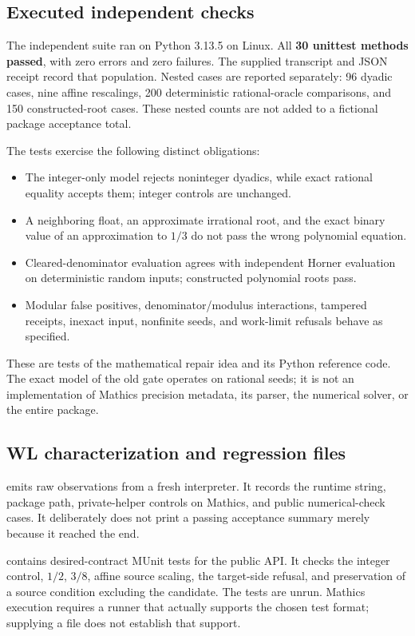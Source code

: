 \documentclass[11pt,letterpaper]{article}
\newcommand{\code}[1]{\texttt{\detokenize{#1}}}
\begin{document}
\subsection{Executed independent checks}

The independent suite ran on Python 3.13.5 on Linux. All \textbf{30 unittest methods passed}, with zero errors and zero failures. The supplied transcript and JSON receipt record that population. Nested cases are reported separately: 96 dyadic cases, nine affine rescalings, 200 deterministic rational-oracle comparisons, and 150 constructed-root cases. These nested counts are not added to a fictional package acceptance total.

The tests exercise the following distinct obligations:
\begin{itemize}
\item The integer-only model rejects noninteger dyadics, while exact rational equality accepts them; integer controls are unchanged.
\item A neighboring float, an approximate irrational root, and the exact binary value of an approximation to $1/3$ do not pass the wrong polynomial equation.
\item Cleared-denominator evaluation agrees with independent \code{Fraction} Horner evaluation on deterministic random inputs; constructed polynomial roots pass.
\item Modular false positives, denominator/modulus interactions, tampered receipts, inexact input, nonfinite seeds, and work-limit refusals behave as specified.
\end{itemize}

These are tests of the mathematical repair idea and its Python reference code. The exact model of the old gate operates on rational seeds; it is not an implementation of Mathics precision metadata, its parser, the numerical solver, or the entire package.

\subsection{WL characterization and regression files}

 emits raw observations from a fresh interpreter. It records the runtime string, package path, private-helper controls on Mathics, and public numerical-check cases. It deliberately does not print a passing acceptance summary merely because it reached the end.

 contains desired-contract MUnit tests for the public API. It checks the integer control, $1/2$, $3/8$, affine source scaling, the target-side refusal, and preservation of a source condition excluding the candidate. The tests are unrun. Mathics execution requires a runner that actually supports the chosen test format; supplying a \code{.wlt} file does not establish that support.
\end{document}
